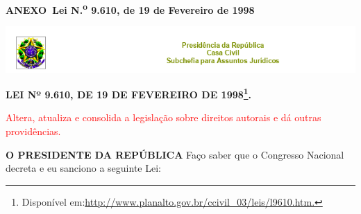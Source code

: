 
\anexos
  \cleardoublepage
    \thispagestyle{empty}
    \vspace*{\fill}
    \begin{center}
        {\bfseries ANEXO~\thechapter{ -- }Lei N\texorpdfstring{.\textsuperscript{o}}{o.} 9.610, de 19 de Fevereiro de 1998}
    \end{center}
    \vspace*{\fill}



\newpage
\centerline{\includegraphics[width=\textwidth]{./PosTexto/Ilustracoes/top.png}}%

\begin{center}
\textbf{LEI Nº 9.610, DE 19 DE FEVEREIRO DE 1998\footnote{Disponível em:\url{http://www.planalto.gov.br/ccivil_03/leis/l9610.htm.}}.}
\end{center}

\hspace{7cm}\parbox{8cm}{\scriptsize{\textcolor{red}{Altera, atualiza e consolida a legislação sobre direitos autorais e dá outras providências.}}}
\vspace{0.3cm}

\textbf{O PRESIDENTE DA REPÚBLICA} Faço saber que o Congresso Nacional decreta e eu sanciono a seguinte Lei:

